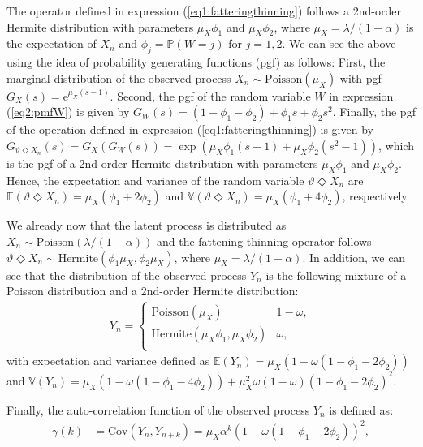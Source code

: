 \documentclass[12pt,twoside, A4paper]{article}
\begin{document}
The operator defined in expression (\ref{eq1:fatteringthinning}) follows a 2nd-order Hermite distribution with parameters $\mu_X\phi_1$ and $\mu_X\phi_2$, where $\mu_X=\lambda/(1-\alpha)$ is the expectation of $X_n$ and $\phi_j=\mathbb{P}(W=j)$ for $j=1,2$. We can see the above using the idea of probability generating functions (pgf) as follows: First, the marginal distribution of the observed process $X_n \sim \textrm{Poisson}(\mu_X)$ with pgf $G_X(s)=\textrm{e}^{\mu_X(s-1)}$. Second, the pgf of the random variable $W$ in expression (\ref{eq2:pmfW}) is given by $G_W(s)=(1-\phi_1-\phi_2)+\phi_1s+\phi_2s^2$. Finally, the pgf of the operation defined in expression (\ref{eq1:fatteringthinning}) is given by $G_{\vartheta \Diamond X_n}(s)=G_X\left(G_W(s)\right)=\exp\left(\mu_X\phi_1(s-1)+\mu_X\phi_2(s^2-1)\right)$, which is the pgf of a 2nd-order Hermite distribution with parameters $\mu_X\phi_1$ and $\mu_X\phi_2$. Hence, the expectation and variance of the random variable $\vartheta \Diamond X_n$ are $\mathbb{E}\left(\vartheta \Diamond X_n\right)=\mu_X\left(\phi_1+2\phi_2\right)$ and $\mathbb{V}\left(\vartheta \Diamond X_n\right)=\mu_X\left(\phi_1+4\phi_2\right)$, respectively. 

We already now that the latent process is distributed as $X_n \sim \textrm{Poisson}(\lambda/(1-\alpha))$ and the fattening-thinning operator follows $\vartheta \Diamond X_n \sim \textrm{Hermite}(\phi_1\mu_X,\phi_2\mu_X)$, where $\mu_X=\lambda/(1-\alpha)$. In addition, we can see that the distribution of the observed process $Y_n$ is the following mixture of a Poisson distribution and a 2nd-order Hermite distribution:
\begin{align}\label{eq:mix}
Y_n=\begin{cases} 
\textrm{Poisson}(\mu_X) &  1-\omega, \\
\textrm{Hermite}\left(\mu_X\phi_1,\mu_X\phi_2\right) &  \omega, \\
\end{cases}
\end{align}
with expectation and variance defined as $\mathbb{E}(Y_n)=\mu_X(1-\omega(1-\phi_1-2\phi_2))$ and $\mathbb{V}(Y_n)=\mu_X(1-\omega (1-\phi_1-4\phi_2))+\mu_X^2\omega(1-\omega)(1-\phi_1-2\phi_2)^2$.

Finally, the auto-correlation function of the observed process $Y_n$ is defined as:  
\begin{align}
\gamma(k)&=\textrm{Cov}\left(Y_n,Y_{n+k}\right)=\mu_X\alpha^k\left(1-\omega\left(1-\phi_1-2\phi_2\right)\right)^2,
\end{align}
\end{document}
